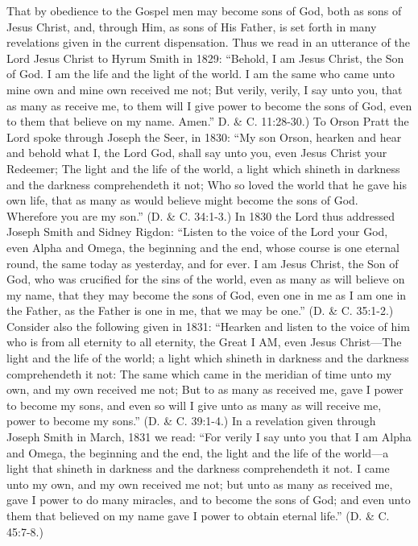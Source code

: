 That by obedience to the Gospel men may become sons of God, both as sons of Jesus Christ,
and, through Him, as sons of His Father, is set forth in many revelations given in the current
dispensation. Thus we read in an utterance of the Lord Jesus Christ to Hyrum Smith in 1829:
``Behold, I am Jesus Christ, the Son of God. I am the life and the light of the world. I am the
same who came unto mine own and mine own received me not; But verily, verily, I say unto
you, that as many as receive me, to them will I give power to become the sons of God, even
to them that believe on my name. Amen.'' D. \& C. 11:28-30.) To Orson Pratt the Lord spoke
through Joseph the Seer, in 1830: ``My son Orson, hearken and hear and behold what I, the
Lord God, shall say unto you, even Jesus Christ your Redeemer; The light and the life of the
world, a light which shineth in darkness and the darkness comprehendeth it not; Who so
loved the world that he gave his own life, that as many as would believe might become the
sons of God. Wherefore you are my son.'' (D. \& C. 34:1-3.) In 1830 the Lord thus addressed
Joseph Smith and Sidney Rigdon: ``Listen to the voice of the Lord your God, even Alpha and
Omega, the beginning and the end, whose course is one eternal round, the same today as
yesterday, and for ever. I am Jesus Christ, the Son of God, who was crucified for the sins of
the world, even as many as will believe on my name, that they may become the sons of God,
even one in me as I am one in the Father, as the Father is one in me, that we may be one.'' (D.
\& C. 35:1-2.) Consider also the following given in 1831: ``Hearken and listen to the voice of
him who is from all eternity to all eternity, the Great I AM, even Jesus Christ—The light and
the life of the world; a light which shineth in darkness and the darkness comprehendeth it
not: The same which came in the meridian of time unto my own, and my own received me
not; But to as many as received me, gave I power to become my sons, and even so will I give
unto as many as will receive me, power to become my sons.'' (D. \& C. 39:1-4.) In a
revelation given through Joseph Smith in March, 1831 we read: ``For verily I say unto you
that I am Alpha and Omega, the beginning and the end, the light and the life of the world—a
light that shineth in darkness and the darkness comprehendeth it not. I came unto my own,
and my own received me not; but unto as many as received me, gave I power to do many
miracles, and to become the sons of God; and even unto them that believed on my name gave
I power to obtain eternal life.'' (D. \& C. 45:7-8.)

